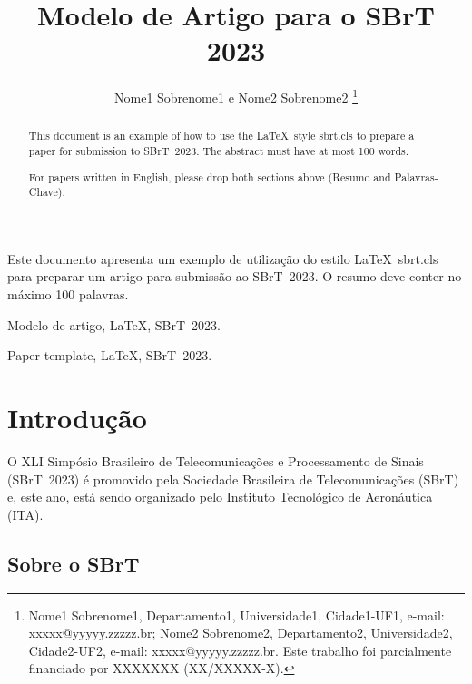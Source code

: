 \documentclass{sbrt}
\begin{document}
\title{Modelo de Artigo para o SBrT 2023}

\author{Nome1 Sobrenome1 e Nome2 Sobrenome2
\thanks{Nome1 Sobrenome1, Departamento1, Universidade1, Cidade1-UF1, e-mail: xxxxx@yyyyy.zzzzz.br; Nome2 Sobrenome2, Departamento2, Universidade2, Cidade2-UF2, e-mail: xxxxx@yyyyy.zzzzz.br. Este trabalho foi parcialmente financiado por XXXXXXX (XX/XXXXX-X).}%
}

\maketitle



\begin{resumo}
Este documento apresenta um exemplo de utiliza\c{c}\~{a}o do estilo \LaTeX\ sbrt.cls para preparar um artigo para submissão ao SBrT~2023. O resumo deve conter no máximo 100 palavras.
\end{resumo}
\begin{chave}
Modelo de artigo, \LaTeX, SBrT~2023.
\end{chave}


\begin{abstract}
This document is an example of how to use the \LaTeX\ style sbrt.cls to prepare a paper for submission to SBrT~2023. The abstract must have at most 100 words.

For papers written in English, please drop both sections above (Resumo and Palavras-Chave).
\end{abstract}
\begin{keywords}
Paper template, \LaTeX, SBrT~2023.
\end{keywords}


\section{Introdução}

O XLI Simpósio Brasileiro de Telecomunicações e Processamento de Sinais (SBrT~2023) é promovido pela Sociedade Brasileira de Telecomunicações (SBrT) e, este ano, está sendo organizado pelo Instituto Tecnológico de Aeronáutica (ITA).


\subsection{Sobre o SBrT}
\end{document}
